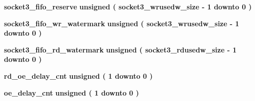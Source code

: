 \begin{DoxyCompactItemize}
\item 
{\bf socket3\+\_\+fifo\+\_\+reserve} {\bfseries \textcolor{comment}{unsigned}\textcolor{vhdlchar}{ }\textcolor{vhdlchar}{(}\textcolor{vhdlchar}{ }\textcolor{vhdlchar}{ }\textcolor{vhdlchar}{ }\textcolor{vhdlchar}{ }{\bfseries {\bf socket3\+\_\+wrusedw\+\_\+size}} \textcolor{vhdlchar}{-\/}\textcolor{vhdlchar}{ } \textcolor{vhdldigit}{1} \textcolor{vhdlchar}{ }\textcolor{keywordflow}{downto}\textcolor{vhdlchar}{ }\textcolor{vhdlchar}{ } \textcolor{vhdldigit}{0} \textcolor{vhdlchar}{ }\textcolor{vhdlchar}{)}\textcolor{vhdlchar}{ }} 
\item 
{\bf socket3\+\_\+fifo\+\_\+wr\+\_\+watermark} {\bfseries \textcolor{comment}{unsigned}\textcolor{vhdlchar}{ }\textcolor{vhdlchar}{(}\textcolor{vhdlchar}{ }\textcolor{vhdlchar}{ }\textcolor{vhdlchar}{ }\textcolor{vhdlchar}{ }{\bfseries {\bf socket3\+\_\+wrusedw\+\_\+size}} \textcolor{vhdlchar}{-\/}\textcolor{vhdlchar}{ } \textcolor{vhdldigit}{1} \textcolor{vhdlchar}{ }\textcolor{keywordflow}{downto}\textcolor{vhdlchar}{ }\textcolor{vhdlchar}{ } \textcolor{vhdldigit}{0} \textcolor{vhdlchar}{ }\textcolor{vhdlchar}{)}\textcolor{vhdlchar}{ }} 
\item 
{\bf socket3\+\_\+fifo\+\_\+rd\+\_\+watermark} {\bfseries \textcolor{comment}{unsigned}\textcolor{vhdlchar}{ }\textcolor{vhdlchar}{(}\textcolor{vhdlchar}{ }\textcolor{vhdlchar}{ }\textcolor{vhdlchar}{ }\textcolor{vhdlchar}{ }{\bfseries {\bf socket3\+\_\+rdusedw\+\_\+size}} \textcolor{vhdlchar}{-\/}\textcolor{vhdlchar}{ } \textcolor{vhdldigit}{1} \textcolor{vhdlchar}{ }\textcolor{keywordflow}{downto}\textcolor{vhdlchar}{ }\textcolor{vhdlchar}{ } \textcolor{vhdldigit}{0} \textcolor{vhdlchar}{ }\textcolor{vhdlchar}{)}\textcolor{vhdlchar}{ }} 
\item 
{\bf rd\+\_\+oe\+\_\+delay\+\_\+cnt} {\bfseries \textcolor{comment}{unsigned}\textcolor{vhdlchar}{ }\textcolor{vhdlchar}{(}\textcolor{vhdlchar}{ }\textcolor{vhdlchar}{ } \textcolor{vhdldigit}{1} \textcolor{vhdlchar}{ }\textcolor{keywordflow}{downto}\textcolor{vhdlchar}{ }\textcolor{vhdlchar}{ } \textcolor{vhdldigit}{0} \textcolor{vhdlchar}{ }\textcolor{vhdlchar}{)}\textcolor{vhdlchar}{ }} 
\item 
{\bf oe\+\_\+delay\+\_\+cnt} {\bfseries \textcolor{comment}{unsigned}\textcolor{vhdlchar}{ }\textcolor{vhdlchar}{(}\textcolor{vhdlchar}{ }\textcolor{vhdlchar}{ } \textcolor{vhdldigit}{1} \textcolor{vhdlchar}{ }\textcolor{keywordflow}{downto}\textcolor{vhdlchar}{ }\textcolor{vhdlchar}{ } \textcolor{vhdldigit}{0} \textcolor{vhdlchar}{ }\textcolor{vhdlchar}{)}\textcolor{vhdlchar}{ }} 

\end{DoxyCompactItemize}
